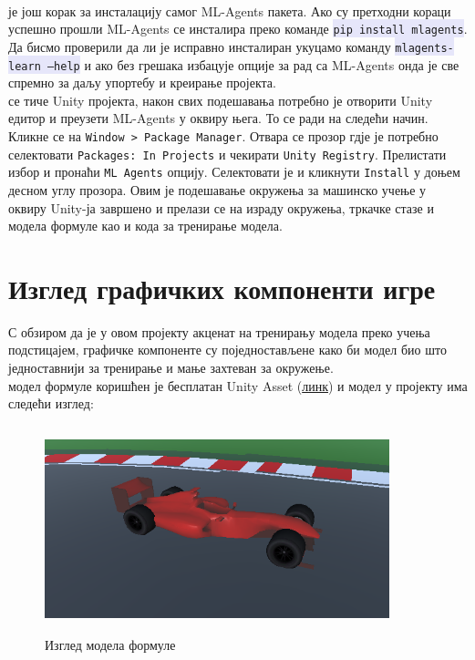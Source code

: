 \documentclass[12pt]{article}
\newcommand{\mycode}[1]{\texttt{\colorbox{Lavender}{#1}}}
\begin{document}
\vspace{0.5cm}\\
 је још корак за инсталацију самог ML-Agents пакета. Ако су претходни кораци успешно прошли ML-Agents се инсталира преко команде \mycode{pip install mlagents}. Да бисмо проверили да ли је исправно инсталиран укуцамо команду \mycode{mlagents-learn ---help} и ако без грешака избацује опције за рад са ML-Agents онда је све спремно за даљу упортебу и креирање пројекта.
\vspace{0.5cm}\\
 се тиче Unity пројекта, након свих подешавања потребно је отворити Unity едитор и преузети ML-Agents у оквиру њега. То се ради на следећи начин. Кликне се на \texttt{Window > Package Manager}. Отвара се прозор гдје је потребно селектовати \texttt{Packages: In Projects} и чекирати \texttt{Unity Registry}. Прелистати избор и пронаћи \texttt{ML Agents} опцију. Селектовати је и кликнути \texttt{Install} у доњем десном углу прозора. Овим је подешавање окружења за машинско учење у оквиру Unity-ја завршено и прелази се на израду окружења, тркачке стазе и модела формуле као и кода за тренирање модела. 


\newpage
\section{Изглед графичких компоненти игре}
С обзиром да је у овом пројекту акценат на тренирању модела преко учења подстицајем, графичке компоненте су поједностављене како би модел био што једноставнији за тренирање и мање захтеван за окружење.\\

 модел формуле коришћен је бесплатан Unity Asset (\href{https://assetstore.unity.com/packages/3d/vehicles/land/formula-one-car-25693}{линк}) и модел у пројекту има следећи изглед:
\begin{figure}[h]
    \centering
    \includegraphics[height=6cm, width=10cm]{images/formula}
    \caption{Изглед модела формуле}
    \label{Image 1:}
\end{figure}
\end{document}
